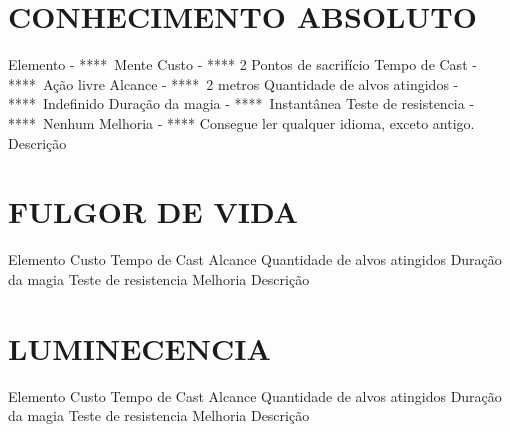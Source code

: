 \documentclass{article}%
\begin{document}
%
\section{CONHECIMENTO ABSOLUTO}%
\label{sec:CONHECIMENTOABSOLUTO}%
Elemento {-} ****~Mente\newline%
Custo {-} **** 2 Pontos de sacrifício\newline%
Tempo de Cast {-} ****~Ação livre\newline%
Alcance {-} ****~2 metros\newline%
Quantidade de alvos atingidos {-} ****~Indefinido\newline%
Duração da magia {-} ****~Instantânea\newline%
Teste de resistencia {-} ****~Nenhum\newline%
Melhoria {-} **** Consegue ler qualquer idioma, exceto antigo.\newline%
Descrição \newline%

%
\section{FULGOR DE VIDA}%
\label{sec:FULGORDEVIDA}%
Elemento \newline%
Custo \newline%
Tempo de Cast \newline%
Alcance \newline%
Quantidade de alvos atingidos \newline%
Duração da magia \newline%
Teste de resistencia \newline%
Melhoria \newline%
Descrição \newline%

%
\section{LUMINECENCIA}%
\label{sec:LUMINECENCIA}%
Elemento \newline%
Custo \newline%
Tempo de Cast \newline%
Alcance \newline%
Quantidade de alvos atingidos \newline%
Duração da magia \newline%
Teste de resistencia \newline%
Melhoria \newline%
Descrição \newline%
\end{document}

